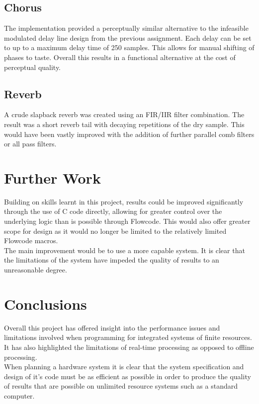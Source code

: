 \documentclass[titlepage]{scrartcl}
\begin{document}
        \subsection{Chorus}
        The implementation provided a perceptually similar alternative to the
        infeasible modulated delay line design from the previous assignment.  
        Each delay can be set to up to a maximum delay time of 250 samples.
        This allows for manual shifting of phases to taste. Overall this
        results in a functional alternative at the cost of perceptual quality.

        \subsection{Reverb}
        A crude slapback reverb was created using an FIR/IIR filter
        combination. The result was a short reverb tail with decaying
        repetitions of the dry sample. This would have been vastly improved
        with the addition of further parallel comb filters or all pass filters.
        
    \section{Further Work}
    Building on skills learnt in this project, results could be improved
    significantly through the use of C code directly, allowing for greater
    control over the underlying logic than is possible through Flowcode. This
    would also offer greater scope for design as it would no longer be limited
    to the relatively limited Flowcode macros.\\
    The main improvement would be to use a more capable system. It is clear
    that the limitations of the system have impeded the quality of results to
    an unreasonable degree. 

    \section{Conclusions}
    Overall this project has offered insight into the performance issues and
    limitations involved when programming for integrated systems of finite
    resources. It has also highlighted the limitations of real-time processing
    as opposed to offline processing.\\
    When planning a hardware system it is clear that the system specification
    and design of it's code must be as efficient as possible in order to
    produce the quality of results that are possible on unlimited resource
    systems such as a standard computer.
    \printbibliography
\end{document}
